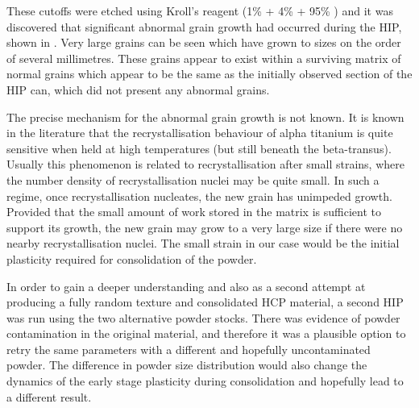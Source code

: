 These cutoffs were etched using Kroll's reagent (1\%  + 4\%  + 95\% ) and it was discovered that significant abnormal grain growth had occurred during the HIP, shown in .
Very large grains can be seen which have grown to sizes on the order of several millimetres.
These grains appear to exist within a surviving matrix of normal grains which appear to be the same as the initially observed section of the HIP can, which did not present any abnormal grains.

The precise mechanism for the abnormal grain growth is not known.
It is known in the literature that the recrystallisation behaviour of alpha titanium is quite sensitive when held at high temperatures (but still beneath the beta-transus)\cite{tongFormationVeryLarge2017}.
Usually this phenomenon is related to recrystallisation after small strains, where the number density of recrystallisation nuclei may be quite small.
In such a regime, once recrystallisation nucleates, the new grain has unimpeded growth.
Provided that the small amount of work stored in the matrix is sufficient to support its growth, the new grain may grow to a very large size if there were no nearby recrystallisation nuclei.
The small strain in our case would be the initial plasticity required for consolidation of the powder.

In order to gain a deeper understanding and also as a second attempt at producing a fully random texture and consolidated HCP material, a second HIP was run using the two alternative powder stocks.
There was evidence of powder contamination in the original material, and therefore it was a plausible option to retry the same parameters with a different and hopefully uncontaminated powder.
The difference in powder size distribution would also change the dynamics of the early stage plasticity during consolidation and hopefully lead to a different result.


